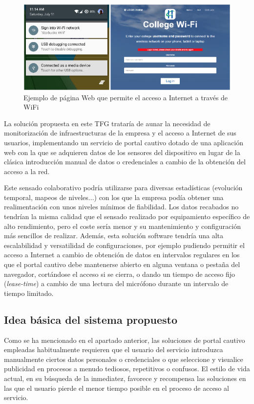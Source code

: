 \begin{figure}[!t]
\begin{center}
\includegraphics[width=0.75\linewidth]{./2_SensadoCol/Img/CaptivePortals.png}
\end{center}
\caption{Ejemplo de página Web que permite el acceso a Internet a través de WiFi}
\label{PortalesEjemplo}
\end{figure}
 
La solución propuesta en este TFG trataría de aunar la necesidad de monitorización de infraestructuras de la empresa y el acceso a Internet de sus usuarios, implementando un servicio de portal cautivo dotado de una aplicación web con la que se adquieren datos de los sensores del dispositivo en lugar de la clásica introducción manual de datos o credenciales a cambio de la obtención del acceso a la red.

Este sensado colaborativo podría utilizarse para diversas estadísticas (evolución temporal, mapeos de niveles...) con los que la empresa podía obtener una realimentación con unos niveles mínimos de fiabilidad. Los datos recabados no tendrían la misma calidad que el sensado realizado por equipamiento específico de alto rendimiento, pero el coste sería menor y su mantenimiento y configuración más sencillos de realizar. Además, esta solución software tendría una alta escalabilidad y versatilidad de configuraciones, por ejemplo pudiendo permitir el acceso a Internet a cambio de obtención de datos en intervalos regulares en los que el portal cautivo debe mantenerse abierto en alguna ventana o pestaña del navegador, cortándose el acceso si se cierra, o dando un tiempo de acceso fijo (\emph{lease-time}) a cambio de una lectura del micrófono durante un intervalo de tiempo limitado.

\subsection{Idea básica del sistema propuesto}

Como se ha mencionado en el apartado anterior, las soluciones de portal cautivo empleadas habitualmente requieren que el usuario del servicio introduzca manualmente ciertos datos personales o credenciales o que seleccione y visualice publicidad en procesos a menudo tediosos, repetitivos o confusos. El estilo de vida actual, en su búsqueda de la inmediatez, favorece y recompensa las soluciones en las que el usuario pierde el menor tiempo posible en el proceso de acceso al servicio.

